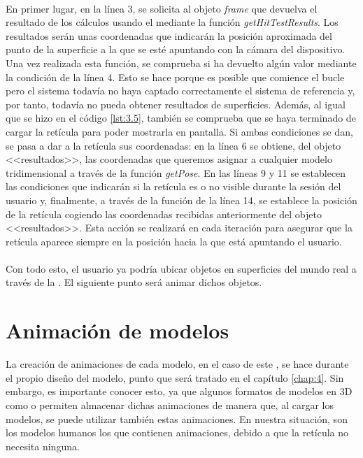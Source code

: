 \documentclass{subfiles}
\begin{document}
        \paragraph{}
        En primer lugar, en la línea 3, se solicita al objeto \textit{frame} que devuelva el resultado de los cálculos usando el \hittestsource mediante la función \textit{getHitTestResults}. Los resultados serán unas coordenadas que indicarán la posición aproximada del punto de la superficie a la que se esté apuntando con la cámara del dispositivo. Una vez realizada esta función, se comprueba si ha devuelto algún valor mediante la condición de la línea 4. Esto se hace porque es posible que comience el bucle pero el sistema todavía no haya captado correctamente el sistema de referencia y, por tanto, todavía no pueda obtener resultados de superficies. Además, al igual que se hizo en el código \ref{lst:3.5}, también se comprueba que se haya terminado de cargar la retícula para poder mostrarla en pantalla. Si ambas condiciones se dan, se pasa a dar a la retícula sus coordenadas: en la línea 6 se obtiene, del objeto <<resultados>>, las coordenadas que queremos asignar a cualquier modelo tridimensional a través de la función \textit{getPose}. En las líneas 9 y 11 se establecen las condiciones que indicarán si la retícula es o no visible durante la sesión del usuario y, finalmente, a través de la función de la línea 14, se establece la posición de la retícula cogiendo las coordenadas recibidas anteriormente del objeto <<resultados>>. Esta acción se realizará en cada iteración para asegurar que la retícula aparece siempre en la posición hacia la que está apuntando el usuario.

        \paragraph{}
        Con todo esto, el usuario ya podría ubicar objetos en superficies del mundo real a través de la \ra. El siguiente punto será animar dichos objetos.

        
        \section{Animación de modelos}
        \label{sec:3.3}
        La creación de animaciones de cada modelo, en el caso de este \tfg, se hace durante el propio diseño del modelo, punto que será tratado en el capítulo \ref{chap:4}. Sin embargo, es importante conocer esto, ya que algunos formatos de modelos en 3D como \glb o \gltf permiten almacenar dichas animaciones de manera que, al cargar los modelos, se puede utilizar también estas animaciones. En nuestra situación, son los modelos humanos los que contienen animaciones, debido a que la retícula no necesita ninguna.
\end{document}
